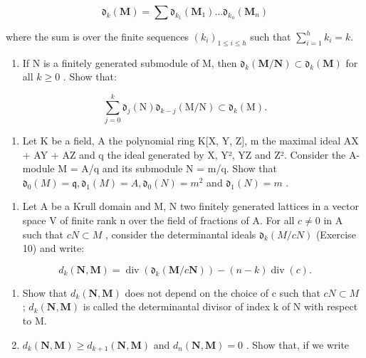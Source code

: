 \[
\mathfrak {d} _ {k} (\mathbf {M}) = \sum \mathfrak {d} _ {k _ {1}} (\mathbf {M} _ {1}) \dots \mathfrak {d} _ {k _ {n}} (\mathbf {M} _ {n})
\]

where the sum is over the finite sequences \((k_{i})_{1\leqslant i\leqslant h}\) such that \(\sum_{i = 1}^{h}k_{i} = k.\)

\begin{enumerate}
\def\labelenumi{(\alph{enumi})}
\setcounter{enumi}{5}
\tightlist
\item
  If N is a finitely generated submodule of M, then \(\mathfrak{d}_{k}(\mathbf{M}/\mathbf{N}) \subset \mathfrak{d}_{k}(\mathbf{M})\) for all \(k \geqslant 0\) . Show that:
\end{enumerate}

\[
\sum_ {j = 0} ^ {k} \mathfrak {d} _ {j} (\mathrm{N}) \mathfrak {d} _ {k - j} (\mathrm{M} / \mathrm{N}) \subset \mathfrak {d} _ {k} (\mathrm{M}).
\]

\begin{enumerate}
\def\labelenumi{(\alph{enumi})}
\setcounter{enumi}{6}
\tightlist
\item
  Let K be a field, A the polynomial ring K{[}X, Y, Z{]}, m the maximal ideal AX + AY + AZ and q the ideal generated by X, Y², YZ and Z². Consider the A-module M = A/q and its submodule N = m/q. Show that \(\mathfrak{d}_{0}(M) = \mathfrak{q}, \mathfrak{d}_{1}(M) = A, \mathfrak{d}_{0}(N) = m^{2}\) and \(\mathfrak{d}_{1}(N) = m\) .
\end{enumerate}

\begin{enumerate}
\def\labelenumi{\arabic{enumi}.}
\setcounter{enumi}{10}
\tightlist
\item
  Let A be a Krull domain and M, N two finitely generated lattices in a vector space V of finite rank n over the field of fractions of A. For all \(c \neq 0\) in A such that \(cN \subset M\) , consider the determinantal ideals \(\mathfrak{d}_{k}(M/cN)\) (Exercise 10) and write:
\end{enumerate}

\[
d _ {k} (\mathbf {N}, \mathbf {M}) = \operatorname{div} \left(\mathfrak {d} _ {k} (\mathbf {M} / c \mathbf {N})\right) - (n - k) \operatorname{div} (c).
\]

\begin{enumerate}
\def\labelenumi{(\alph{enumi})}
\item
  Show that \(d_{k}(\mathbf{N}, \mathbf{M})\) does not depend on the choice of c such that \(cN \subset M\) ; \(d_{k}(\mathbf{N}, \mathbf{M})\) is called the determinantal divisor of index k of N with respect to M.
\item
  \(d_{k}(\mathbf{N},\mathbf{M})\geqslant d_{k + 1}(\mathbf{N},\mathbf{M})\) and \(d_{n}(\mathbf{N},\mathbf{M}) = 0\) . Show that, if we write
\end{enumerate}

